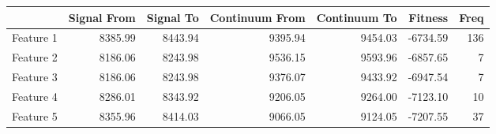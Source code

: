\begin{table}
\begin{center}
\begin{tabular}{rrrrrrr}
  \hline
 & Signal From & Signal To & Continuum From & Continuum To & Fitness & Freq \\ 
  \hline
Feature 1 & 8385.99 & 8443.94 & 9395.94 & 9454.03 & -6734.59 & 136 \\ 
  Feature 2 & 8186.06 & 8243.98 & 9536.15 & 9593.96 & -6857.65 &   7 \\ 
  Feature 3 & 8186.06 & 8243.98 & 9376.07 & 9433.92 & -6947.54 &   7 \\ 
  Feature 4 & 8286.01 & 8343.92 & 9206.05 & 9264.00 & -7123.10 &  10 \\ 
  Feature 5 & 8355.96 & 8414.03 & 9066.05 & 9124.05 & -7207.55 &  37 \\ 

\end{tabular}
\end{center}
\end{table}

